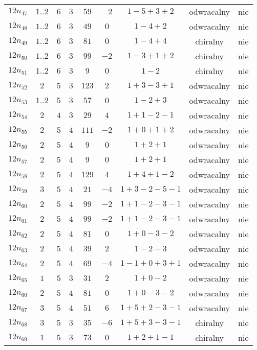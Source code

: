 \begin{longtable}{ccccccccc}
$12n_{47}$ & $1..2$ & $6$ & $3$ & $59$ & $-2$ & $1-5+3+2$ & odwracalny & nie \\
$12n_{48}$ & $1..2$ & $6$ & $3$ & $49$ & $0$ & $1-4+2$ & odwracalny & nie \\
$12n_{49}$ & $1..2$ & $6$ & $3$ & $81$ & $0$ & $1-4+4$ & chiralny & nie \\
$12n_{50}$ & $1..2$ & $6$ & $3$ & $99$ & $-2$ & $1-3+1+2$ & chiralny & nie \\
$12n_{51}$ & $1..2$ & $6$ & $3$ & $9$ & $0$ & $1-2$ & chiralny & nie \\
$12n_{52}$ & $2$ & $5$ & $3$ & $123$ & $2$ & $1+3-3+1$ & odwracalny & nie \\
$12n_{53}$ & $1..2$ & $5$ & $3$ & $57$ & $0$ & $1-2+3$ & odwracalny & nie \\
$12n_{54}$ & $2$ & $4$ & $3$ & $29$ & $4$ & $1+1-2-1$ & odwracalny & nie \\
$12n_{55}$ & $2$ & $5$ & $4$ & $111$ & $-2$ & $1+0+1+2$ & odwracalny & nie \\
$12n_{56}$ & $2$ & $5$ & $4$ & $9$ & $0$ & $1+2+1$ & odwracalny & nie \\
$12n_{57}$ & $2$ & $5$ & $4$ & $9$ & $0$ & $1+2+1$ & odwracalny & nie \\
$12n_{58}$ & $2$ & $5$ & $4$ & $129$ & $4$ & $1+4+1-2$ & odwracalny & nie \\
$12n_{59}$ & $3$ & $5$ & $4$ & $21$ & $-4$ & $1+3-2-5-1$ & odwracalny & nie \\
$12n_{60}$ & $2$ & $5$ & $4$ & $99$ & $-2$ & $1+1-2-3-1$ & odwracalny & nie \\
$12n_{61}$ & $2$ & $5$ & $4$ & $99$ & $-2$ & $1+1-2-3-1$ & odwracalny & nie \\
$12n_{62}$ & $2$ & $5$ & $4$ & $81$ & $0$ & $1+0-3-2$ & odwracalny & nie \\
$12n_{63}$ & $2$ & $5$ & $4$ & $39$ & $2$ & $1-2-3$ & odwracalny & nie \\
$12n_{64}$ & $2$ & $5$ & $4$ & $69$ & $-4$ & $1-1+0+3+1$ & odwracalny & nie \\
$12n_{65}$ & $1$ & $5$ & $3$ & $31$ & $2$ & $1+0-2$ & odwracalny & nie \\
$12n_{66}$ & $2$ & $5$ & $4$ & $81$ & $0$ & $1+0-3-2$ & odwracalny & nie \\
$12n_{67}$ & $3$ & $5$ & $4$ & $51$ & $6$ & $1+5+2-3-1$ & odwracalny & nie \\
$12n_{68}$ & $3$ & $5$ & $3$ & $35$ & $-6$ & $1+5+3-3-1$ & chiralny & nie \\
$12n_{69}$ & $1$ & $5$ & $3$ & $73$ & $0$ & $1+2+1-1$ & chiralny & nie \\

\end{longtable}
